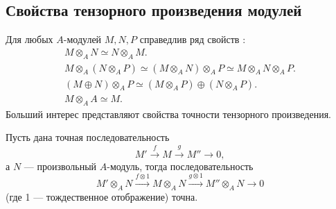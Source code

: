     \subsection{Свойства тензорного произведения модулей}

    Для любых $A$-модулей $M, N, P$ справедлив ряд свойств \cite{A-M}:
    \begin{gather}
        M \otimes_A N \simeq N \otimes_A M.\\
        M \otimes_A (N \otimes_A P) \simeq (M \otimes_A N) \otimes_A P \simeq M \otimes_A N \otimes_A P.\\
        (M \oplus N) \otimes_A P \simeq (M \otimes_A P) \oplus (N \otimes_A P). \label{prod_distr}\\
        M \otimes_A A \simeq M. \label{ring_mult}
    \end{gather}
    Больший интерес представляют свойства точности тензорного произведения. 
    
    



    \begin{Theorem}{\cite{A-M}}
        Пусть дана точная последовательность 
        \begin{equation}
            M' \xrightarrow{f} M \xrightarrow{g} M'' \rightarrow 0,
        \end{equation}
        а $N$ --- произвольный $A$-модуль, тогда последовательность 
        \begin{equation}
            M' \otimes_A N \xrightarrow{f \otimes 1} M \otimes_A N \xrightarrow{g \otimes 1} M'' \otimes_A N \rightarrow 0
        \end{equation}
        (где 1 --- тождественное отображение) точна.
    \end{Theorem}

